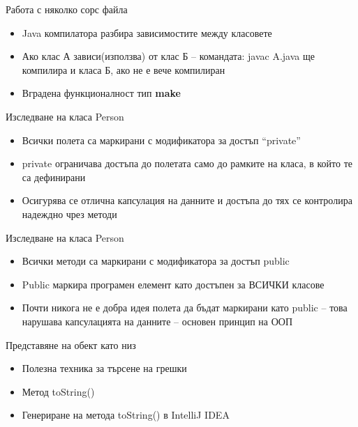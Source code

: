 \documentclass{beamer}
\begin{document}
\begin{frame}{Работа с няколко сорс файла}
  \transdissolve
  \begin{itemize}
  \item Java компилатора разбира
    зависимостите между класовете
  \item Ако клас А зависи(използва) от клас Б –
    командата:
    javac A.java
    ще компилира и класа Б, ако не е вече
    компилиран
  \item Вградена функционалност тип \textbf{make}
  \end{itemize}
\end{frame}

\begin{frame}{Изследване на класа Person}
  \transdissolve
  \begin{itemize}
  \item Всички полета са маркирани с
    модификатора за достъп “private”
  \item private ограничава достъпа до полетата
    само до рамките на класа, в който те са
    дефинирани
  \item Осигурява се отлична капсулация на
    данните и достъпа до тях се контролира
    надеждно чрез методи
  \end{itemize}
\end{frame}

\begin{frame}{Изследване на класа Person}
  \transdissolve
  \begin{itemize}
  \item Всички методи са маркирани с
    модификатора за достъп public
  \item Public маркира програмен елемент като
    достъпен за ВСИЧКИ класове
  \item Почти никога не е добра идея полета да
    бъдат маркирани като public – това
    нарушава капсулацията на данните –
    основен принцип на ООП
  \end{itemize}
\end{frame}

\begin{frame}{Представяне на обект като низ}
  \transdissolve
  \begin{itemize}
  \item Полезна техника за търсене на грешки
  \item Метод toString()
  \item Генериране на метода toString() в IntelliJ IDEA
  \end{itemize}
\end{frame}
\end{document}
